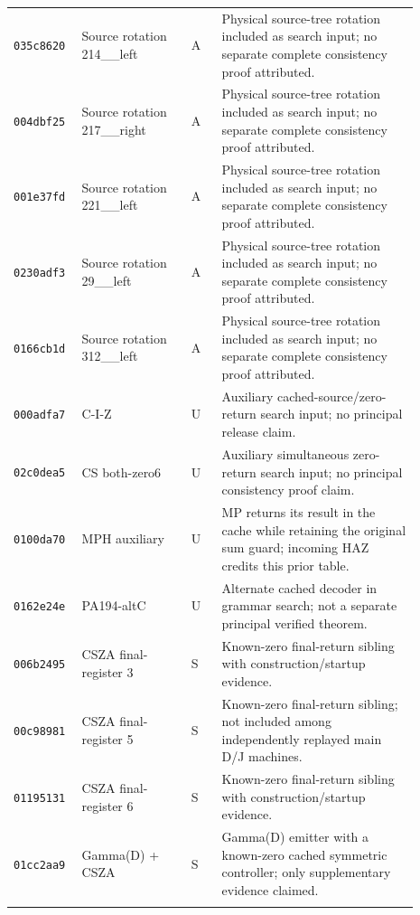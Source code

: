 \begin{longtable}{p{0.12\linewidth}p{0.25\linewidth}p{0.07\linewidth}p{0.45\linewidth}}
\texttt{035c8620} & Source rotation 214\_\allowbreak 312\_\allowbreak left & A & Physical source-tree rotation included as search input; no separate complete consistency proof attributed. \\ \addlinespace[2pt]
\texttt{004dbf25} & Source rotation 217\_\allowbreak 197\_\allowbreak right & A & Physical source-tree rotation included as search input; no separate complete consistency proof attributed. \\ \addlinespace[2pt]
\texttt{001e37fd} & Source rotation 221\_\allowbreak 217\_\allowbreak left & A & Physical source-tree rotation included as search input; no separate complete consistency proof attributed. \\ \addlinespace[2pt]
\texttt{0230adf3} & Source rotation 29\_\allowbreak 44\_\allowbreak left & A & Physical source-tree rotation included as search input; no separate complete consistency proof attributed. \\ \addlinespace[2pt]
\texttt{0166cb1d} & Source rotation 312\_\allowbreak 38\_\allowbreak left & A & Physical source-tree rotation included as search input; no separate complete consistency proof attributed. \\ \addlinespace[2pt]
\texttt{000adfa7} & C-I-Z & U & Auxiliary cached-source/zero-return search input; no principal release claim. \\ \addlinespace[2pt]
\texttt{02c0dea5} & CS both-zero6 & U & Auxiliary simultaneous zero-return search input; no principal consistency proof claim. \\ \addlinespace[2pt]
\texttt{0100da70} & MPH auxiliary & U & MP returns its result in the cache while retaining the original sum guard; incoming HAZ credits this prior table. \\ \addlinespace[2pt]
\texttt{0162e24e} & PA194-altC & U & Alternate cached decoder in grammar search; not a separate principal verified theorem. \\ \addlinespace[2pt]
\texttt{006b2495} & CSZA final-register 3 & S & Known-zero final-return sibling with construction/startup evidence. \\ \addlinespace[2pt]
\texttt{00c98981} & CSZA final-register 5 & S & Known-zero final-return sibling; not included among independently replayed main D/J machines. \\ \addlinespace[2pt]
\texttt{01195131} & CSZA final-register 6 & S & Known-zero final-return sibling with construction/startup evidence. \\ \addlinespace[2pt]
\texttt{01cc2aa9} & Gamma(D) + CSZA & S & Gamma(D) emitter with a known-zero cached symmetric controller; only supplementary evidence claimed. \\ \addlinespace[2pt]

\end{longtable}
